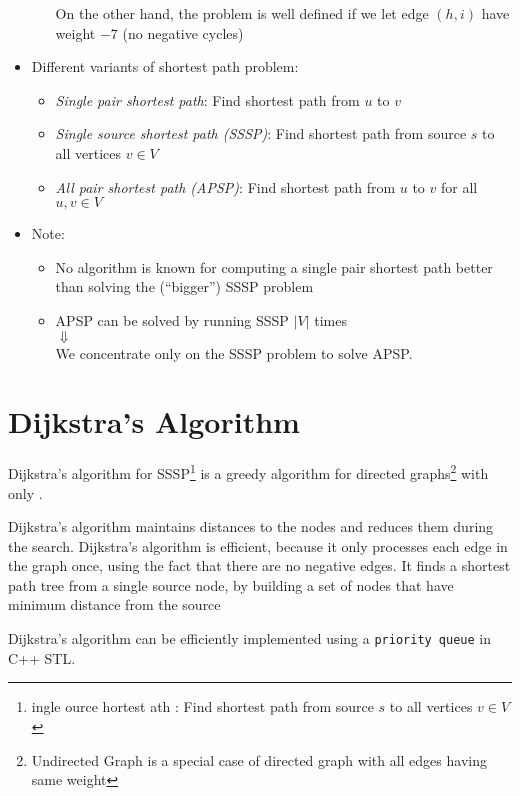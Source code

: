 \documentclass[twoside,12pt,a4paper,english]{book}
\theoremstyle{definition}
\theoremstyle{problemstyle}
\begin{document}
\begin{itemize}
\begin{itemize}
  On the other hand, the problem is well defined if we let edge
  $(h,i)$ have weight $-7$ (no negative cycles)
\end{itemize}
\item Different variants of shortest path problem:
  \begin{itemize}
  \item {\em Single pair shortest path}: Find shortest path from $u$
    to $v$
  \item {\em Single source shortest path (SSSP)}: Find shortest path
    from source $s$ to all vertices $v \in V$
  \item {\em All pair shortest path (APSP)}: Find shortest path from
    $u$ to $v$ for all $u,v \in V$
  \end{itemize}
\item Note:
  \begin{itemize}
  \item No algorithm is known for computing a single pair shortest path
    better than solving the (``bigger'') SSSP problem
  \item APSP can be solved by running SSSP $\vert V \vert$ times \\
    $\Downarrow$ \\
    We concentrate only on the SSSP problem to solve APSP.
  \end{itemize}
\end{itemize}

\chapter{Dijkstra’s Algorithm}

Dijkstra’s algorithm for SSSP\footnote{ingle ource hortest ath : Find shortest path from source $s$ to all vertices $v \in V$} is a greedy algorithm for directed graphs\footnote{Undirected Graph is a special case of directed graph with all edges having same weight} with only .

Dijkstra’s algorithm maintains distances
to the nodes and reduces them during the search. Dijkstra’s algorithm is efficient,
because it only processes each edge in the graph once, using the fact that there
are no negative edges. It finds a shortest path tree from a single source node, by building a set of nodes that have minimum distance from the source

Dijkstra's algorithm can be efficiently implemented using a \texttt{priority queue} in C++ STL.
\end{document}
